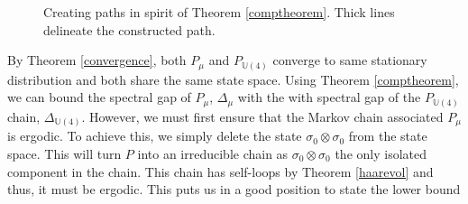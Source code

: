 \documentclass[12pt]{amsart}
\theoremstyle{definition}
\theoremstyle{remark}
\numberwithin{equation}{section}
\theoremstyle{remark}
\begin{document}
\begin{figure}[h!] \label{compfig}
  \centering
  \caption{Creating paths in spirit of Theorem \ref{comptheorem}. Thick lines delineate the constructed path.}
\end{figure}

By Theorem \ref{convergence}, both $P_{\mu}$ and $P_{\mathbb{U}(4)}$ converge to same stationary distribution and both share the same state space. Using Theorem \ref{comptheorem}, we can bound the spectral gap of $P_\mu$, $\Delta_\mu$ with the with spectral gap of the $P_{\mathbb{U}(4)}$ chain, $\Delta_{\mathbb{U}(4)}$. However, we must first ensure that the Markov chain associated $P_\mu$ is ergodic. To achieve this, we simply delete the state $\sigma_0 \otimes \sigma_0$ from the state space.   This will turn $P$ into an irreducible chain as $\sigma_0 \otimes \sigma_0$ the only isolated component in the chain. This chain has self-loops by Theorem \ref{haarevol} and thus, it must be ergodic. This puts us in a good position to state the lower bound

\end{document}
